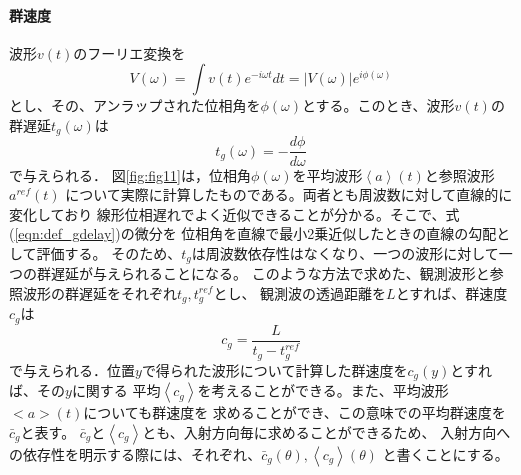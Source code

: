 \paragraph{群速度}
波形$v(t)$のフーリエ変換を
\begin{equation}
	V(\omega)=\int v(t)e^{-i\omega t} dt = \left| V(\omega) \right|e^{i\phi(\omega)}
	\label{eqn:phase}
\end{equation}
とし、その、アンラップされた位相角を$\phi(\omega)$とする。このとき、波形$v(t)$の
群遅延$t_g(\omega)$は
\begin{equation}
	t_g(\omega)=-\frac{d\phi}{d\omega}
	\label{eqn:def_gdelay}
\end{equation}
で与えられる．
図\ref{fig:fig11}は，位相角$\phi(\omega)$を平均波形$\left<a\right>(t)$と参照波形$a^{ref}(t)$
について実際に計算したものである。両者とも周波数に対して直線的に変化しており
線形位相遅れでよく近似できることが分かる。そこで、式(\ref{eqn:def_gdelay})の微分を
位相角を直線で最小2乗近似したときの直線の勾配として評価する。
そのため、$t_g$は周波数依存性はなくなり、一つの波形に対して一つの群遅延が与えられることになる。
このような方法で求めた、観測波形と参照波形の群遅延をそれぞれ$t_g, t_g^{ref}$とし、
観測波の透過距離を$L$とすれば、群速度$c_g$は
\begin{equation}
	c_g=\frac{L}{t_g-t_g^{ref}}
	\label{eqn:def_cg}
\end{equation}
で与えられる．位置$y$で得られた波形について計算した群速度を$c_g(y)$とすれば、その$y$に関する
平均$\left< c_g \right>$を考えることができる。また、平均波形$<a>(t)$についても群速度を
求めることができ、この意味での平均群速度を $\bar c_g$と表す。
$\bar c_g$と$\left< c_g \right>$とも、入射方向毎に求めることができるため、
入射方向への依存性を明示する際には、それぞれ、$\bar c_g(\theta), \left< c_g\right>(\theta)$
と書くことにする。
